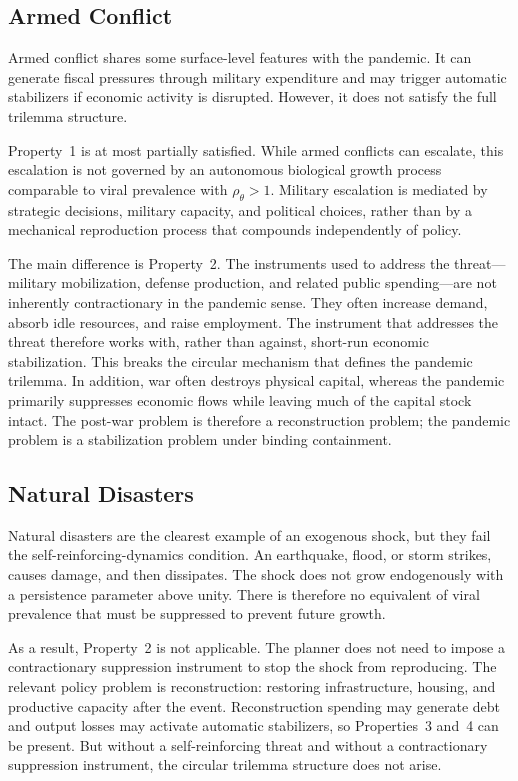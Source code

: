 \documentclass[12pt, a4paper]{article}
\begin{document}
\subsection*{Armed Conflict}

Armed conflict shares some surface-level features with the pandemic. It can generate fiscal pressures through military expenditure and may trigger automatic stabilizers if economic activity is disrupted. However, it does not satisfy the full trilemma structure.

Property~1 is at most partially satisfied. While armed conflicts can escalate, this escalation is not governed by an autonomous biological growth process comparable to viral prevalence with $\rho_\theta>1$. Military escalation is mediated by strategic decisions, military capacity, and political choices, rather than by a mechanical reproduction process that compounds independently of policy.

The main difference is Property~2. The instruments used to address the threat---military mobilization, defense production, and related public spending---are not inherently contractionary in the pandemic sense. They often increase demand, absorb idle resources, and raise employment. The instrument that addresses the threat therefore works with, rather than against, short-run economic stabilization. This breaks the circular mechanism that defines the pandemic trilemma. In addition, war often destroys physical capital, whereas the pandemic primarily suppresses economic flows while leaving much of the capital stock intact. The post-war problem is therefore a reconstruction problem; the pandemic problem is a stabilization problem under binding containment.

\subsection*{Natural Disasters}

Natural disasters are the clearest example of an exogenous shock, but they fail the self-reinforcing-dynamics condition. An earthquake, flood, or storm strikes, causes damage, and then dissipates. The shock does not grow endogenously with a persistence parameter above unity. There is therefore no equivalent of viral prevalence that must be suppressed to prevent future growth.

As a result, Property~2 is not applicable. The planner does not need to impose a contractionary suppression instrument to stop the shock from reproducing. The relevant policy problem is reconstruction: restoring infrastructure, housing, and productive capacity after the event. Reconstruction spending may generate debt and output losses may activate automatic stabilizers, so Properties~3 and~4 can be present. But without a self-reinforcing threat and without a contractionary suppression instrument, the circular trilemma structure does not arise.
\end{document}
